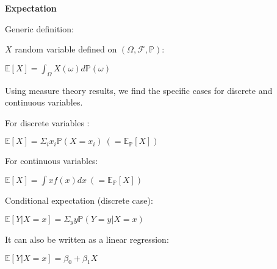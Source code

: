 {\fontsize{12pt}{22pt} \textbf{Expectation}\par}

\vspace{5mm}

Generic definition:

$X$ random variable defined on $(\Omega, \mathcal{F} ,\mathbb{P})$:

$\mathbb{E}[X] = \int_{\Omega} X(\omega) d\mathbb{P}(\omega)$

\vspace{5mm}

Using measure theory results, we find the specific cases for discrete and continuous variables.

\vspace{5mm}

For discrete variables :

$\mathbb{E}[X] = \Sigma_i x_i \mathbb{P}(X=x_i)~(= \mathbb{E}_{\mathbb{P}}[X])$

\vspace{5mm}

For continuous variables:

$\mathbb{E}[X] = \int x f(x) dx~(= \mathbb{E}_{\mathbb{P}}[X])$

\vspace{5mm}

Conditional expectation (discrete case):

$\mathbb{E}[Y|X=x] = \Sigma_y y \mathbb{P}(Y=y | X=x)$

It can also be written as a linear regression:

$\mathbb{E}[Y|X=x] = \beta_0 + \beta_1 X$

\vspace{5mm}